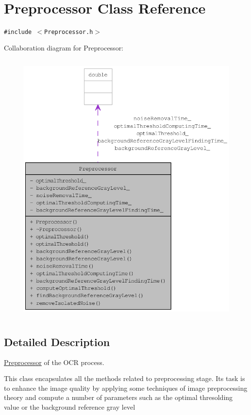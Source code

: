 \hypertarget{class_preprocessor}{
\section{Preprocessor Class Reference}
\label{class_preprocessor}
}
{\tt \#include $<$Preprocessor.h$>$}

Collaboration diagram for Preprocessor:\nopagebreak
\begin{figure}[H]
\begin{center}
\leavevmode
\includegraphics[height=400pt]{class_preprocessor__coll__graph}
\end{center}
\end{figure}


\subsection{Detailed Description}
\hyperlink{class_preprocessor}{Preprocessor} of the OCR process. 

This class encapsulates all the methods related to preprocessing stage. Its task is to enhance the image quality by applying some techniques of image preprocessing theory and compute a number of parameters such as the optimal thresolding value or the background reference gray level

